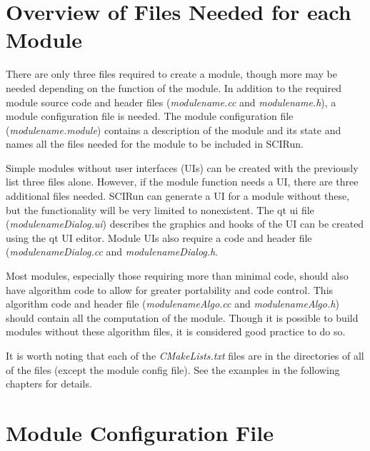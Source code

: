 \documentclass[fleqn,11pt,openany]{book}
\begin{document}
\section{Overview of Files Needed for each Module}
\label{sec:overview}

There are only three files required to create a module, though more may be needed depending on the function of the module.
In addition to the required module source code and header files (\emph{modulename.cc} and \emph{modulename.h}), a module configuration file is needed.
The module configuration file (\emph{modulename.module}) contains a description of the module and its state and names all the files needed for the module to be included in SCIRun.  

Simple modules without user interfaces (UIs) can be created with the previously list three files alone.
However, if the module function needs a UI, there are three additional files needed.  
SCIRun can generate a UI for a module without these, but the functionality will be very limited to nonexistent.  
The qt ui file (\emph{modulenameDialog.ui}) describes the graphics and hooks of the UI can be created using the qt UI editor.
Module UIs also require a code and header file (\emph{modulenameDialog.cc} and \emph{modulenameDialog.h}.

Most modules, especially those requiring more than minimal code, should also have algorithm code to allow for greater portability and code control.  
This algorithm code and header file (\emph{modulenameAlgo.cc} and \emph{modulenameAlgo.h}) should contain all the computation of the module.
Though it is possible to build modules without these algorithm files, it is considered good practice to do so.

It is worth noting that each of the \emph{CMakeLists.txt} files are in the directories of all of the files (except the module config file).  
See the examples in the following chapters for details.  %


\section{Module Configuration File}
\label{sec:config}
\end{document}
